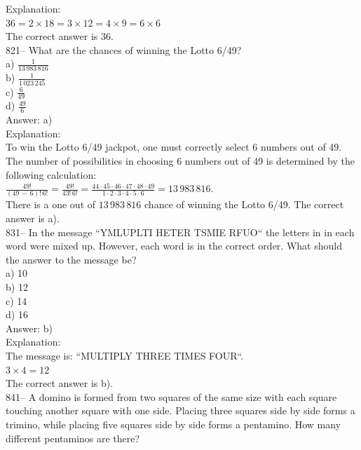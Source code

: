 \documentclass[letterpaper, 12pt]{article}
\begin{document}
Explanation: \\
$36=2\times18=3\times12=4\times9=6\times6$\\
The correct answer is 36.\\

821-- What are the chances of winning the Lotto 6/49?\\
a) $\frac{1}{13\,983\,816}$\\ [2mm] b) $\frac{1}{1\,023\,245}$\\
[2mm] c) $\frac{6}{49}$\\ [2mm]
d) $\frac{49}{6}$\\

Answer: a)\\

Explanation: \\
To win the Lotto 6/49 jackpot, one must correctly select 6 numbers out of 49. The number of possibilities in choosing 6 numbers out of 49 is determined by the following calculation:\\[2mm]
$\frac{49!}{\left( 49\,-\,6\right)
!\,6!}=\frac{49!}{43!\,6!}=\frac{44\cdot45\cdot46\cdot47\cdot48\cdot49}{1\cdot2\cdot3\cdot4\cdot5\cdot6}=13\,983\,816$.\\[2mm]
There is a one out of $13\,983\,816$ chance of winning the Lotto 6/49. The correct answer is a).\\

831-- In the message ``YMLUPLTI HETER TSMIE RFUO`` the letters in in each word were mixed up. However, each word is in the correct order. What should the answer to the message be?\\
a) 10\\
b) 12\\
c) 14\\
d)  16\\

Answer: b)\\

Explanation: \\
The message is: ``MULTIPLY THREE TIMES FOUR``.\\
$3\times4=12$\\
The correct answer is b).\\

841-- A domino is formed from two squares of the same size with each square touching another square with one side. Placing three squares side by side forms a trimino, while placing five squares side by side forms a pentamino.  How many different pentaminos are there?\\
\end{document}
